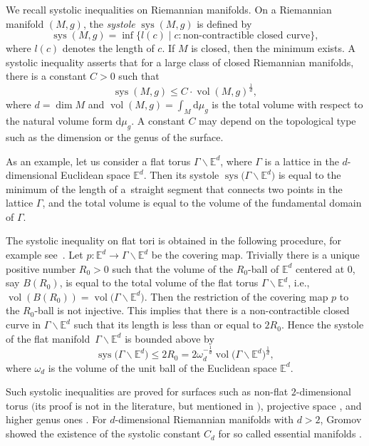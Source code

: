 \documentclass[pdftex]{sigma}
\numberwithin{equation}{section}
\newcommand{\E}{\mathbb{E}}
\begin{document}
We recall systolic inequalities on Riemannian manifolds.
On a Riemannian manifold $(M,g)$,
the \textit{systole} $\operatorname{sys}(M,g)$ is defined by
\[
\operatorname{sys}(M,g)=\inf\{l(c)\mid c\colon\text{non-contractible closed curve}\},
\]
where $l(c)$ denotes the length of $c$.
If $M$ is closed,
then the minimum exists.
A systolic inequality asserts that for a large class of closed Riemannian manifolds,
there is a constant $C>0$ such that
\[
\operatorname{sys}(M,g)\leq C\cdot \operatorname{vol}(M,g)^{\frac{1}{d}},
\]
where $d=\dim M$ and $\operatorname{vol}(M,g)=\int_{M}\mathrm{d}\mu_g$ is the total volume with respect to the natural volume form $\mathrm{d}\mu_g$.
A constant $C$ may depend on the topological type such as the dimension or the genus of the surface.

As an example,
let us consider a flat torus $\Gamma\backslash \E^d$,
where $\Gamma$ is a lattice in the $d$-dimensional Euclidean space $\E^d$.
Then its systole $\operatorname{sys}\big(\Gamma\backslash \E^d\big)$ is equal to the minimum of the length of a~straight segment that connects two points in the lattice $\Gamma$,
and the total volume is equal to the volume of the fundamental domain of $\Gamma$.

The systolic inequality on flat tori is obtained in the following procedure,
for example see~\cite[Section~1]{gro}.
Let $p\colon\E^d\to \Gamma\backslash \E^d$ be the covering map.
Trivially there is a unique positive number $R_0>0$ such that the volume of the $R_0$-ball of $\E^d$ centered at $0$,
say $B(R_0)$,
is equal to the total volume of the flat torus $\Gamma\backslash \E^d$, i.e., $\operatorname{vol}(B(R_0))=\operatorname{vol}\big(\Gamma\backslash \E^d\big)$.
Then the restriction of the covering map $p$ to the $R_0$-ball is not injective.
This implies that there is a non-contractible closed curve in $\Gamma\backslash \E^d$ such that its length is less than or equal to $2R_0$.
Hence the systole of the flat mani\-fold~$\Gamma\backslash \E^d$ is bounded above by
\[\operatorname{sys}\big(\Gamma\backslash \E^d\big)\leq 2R_0=2\omega_d^{-\frac{1}{d}}\operatorname{vol}\big(\Gamma\backslash \E^d\big)^{\frac{1}{d}},\]
where $\omega_d$ is the volume of the unit ball of the Euclidean space $\E^d$.

Such systolic inequalities are proved for surfaces such as non-flat $2$-dimensional torus $($its proof is not in the literature, but mentioned in \cite{pu}$)$,
projective space \cite{pu},
and higher genus ones \cite{bav, gro2, heb}.
For $d$-dimensional Riemannian manifolds with $d>2$,
Gromov showed the existence of the systolic constant $C_d$ for so called essential manifolds \cite{gro2}.
\end{document}
